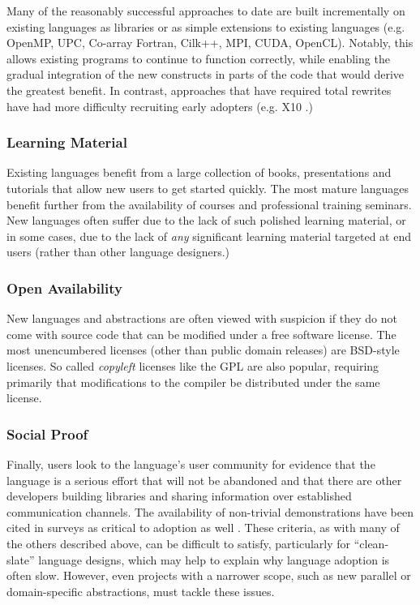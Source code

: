 \documentclass{llncs}
\begin{document}
Many of the reasonably successful approaches to date are built incrementally on existing languages as libraries or as simple  extensions to existing languages (e.g. OpenMP, UPC, Co-array Fortran, Cilk++, MPI, CUDA, OpenCL). Notably, this allows existing programs to continue to function correctly, while enabling the gradual integration of the new constructs in parts of the code that would derive the greatest benefit. In contrast, approaches that have required total rewrites have had more difficulty recruiting early adopters (e.g. X10 \cite{charles2005x10}.)

\subsubsection{Learning Material}
Existing languages benefit from a large collection of books, presentations and tutorials that allow new users to get started quickly. The most mature languages benefit further from the availability of courses and professional training seminars. New languages often suffer due to the lack of such polished learning material, or in some cases, due to the lack of {\it any} significant learning material targeted at end users (rather than other language designers.)

\subsubsection{Open Availability}
New languages and abstractions are often viewed with suspicion if they do not come with source code that can be modified under a free software license. The most unencumbered licenses (other than public domain releases) are BSD-style licenses. So called {\it copyleft} licenses like the GPL are also popular, requiring primarily that modifications to the compiler be distributed under the same license.

\subsubsection{Social Proof}\label{social}
Finally, users look to the language's user community for evidence that the language is a serious effort that will not be abandoned and that there are other developers building libraries and sharing information over established communication channels. The availability of non-trivial demonstrations have been cited in surveys as critical to adoption as well \cite{basili2008understanding}. These criteria, as with many of the others described above, can be difficult to satisfy, particularly for ``clean-slate'' language designs, which may help to explain why language adoption is often slow. However, even projects with a narrower scope, such as new parallel or domain-specific abstractions, must tackle these issues.
\end{document}
